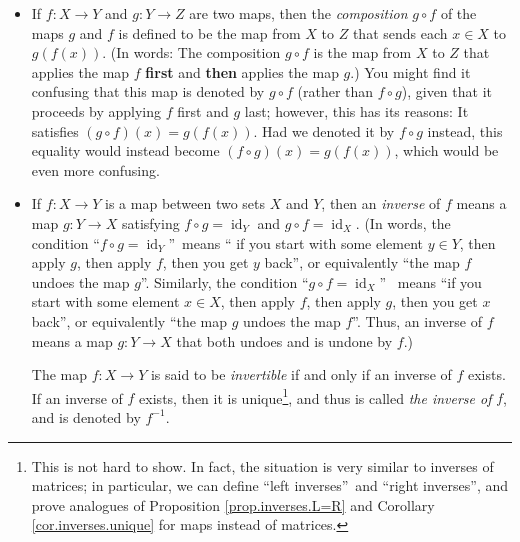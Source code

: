 \documentclass[numbers=enddot,12pt,final,onecolumn,notitlepage]{scrartcl}%
\theoremstyle{definition}
\begin{document}
\begin{itemize}
\item If $f:X\rightarrow Y$ and $g:Y\rightarrow Z$ are two maps, then the
\textit{composition} $g\circ f$ of the maps $g$ and $f$ is defined to be the
map from $X$ to $Z$ that sends each $x\in X$ to $g\left(  f\left(  x\right)
\right)  $. (In words: The composition $g\circ f$ is the map from $X$ to $Z$
that applies the map $f$ \textbf{first} and \textbf{then} applies the map
$g$.) You might find it confusing that this map is denoted by $g\circ f$
(rather than $f\circ g$), given that it proceeds by applying $f$ first and $g$
last; however, this has its reasons: It satisfies $\left(  g\circ f\right)
\left(  x\right)  =g\left(  f\left(  x\right)  \right)  $. Had we denoted it
by $f\circ g$ instead, this equality would instead become $\left(  f\circ
g\right)  \left(  x\right)  =g\left(  f\left(  x\right)  \right)  $, which
would be even more confusing.

\item If $f:X\rightarrow Y$ is a map between two sets $X$ and $Y$, then an
\textit{inverse} of $f$ means a map $g:Y\rightarrow X$ satisfying $f\circ
g=\operatorname*{id}\nolimits_{Y}$ and $g\circ f=\operatorname*{id}%
\nolimits_{X}$. (In words, the condition \textquotedblleft$f\circ
g=\operatorname*{id}\nolimits_{Y}$\textquotedblright\ means \textquotedblleft
if you start with some element $y\in Y$, then apply $g$, then apply $f$, then
you get $y$ back\textquotedblright, or equivalently \textquotedblleft the map
$f$ undoes the map $g$\textquotedblright. Similarly, the condition
\textquotedblleft$g\circ f=\operatorname*{id}\nolimits_{X}$\textquotedblright%
\ means \textquotedblleft if you start with some element $x\in X$, then apply
$f$, then apply $g$, then you get $x$ back\textquotedblright, or equivalently
\textquotedblleft the map $g$ undoes the map $f$\textquotedblright. Thus, an
inverse of $f$ means a map $g:Y\rightarrow X$ that both undoes and is undone
by $f$.)

The map $f:X\rightarrow Y$ is said to be \textit{invertible} if and only if an
inverse of $f$ exists. If an inverse of $f$ exists, then it is
unique\footnote{This is not hard to show. In fact, the situation is very
similar to inverses of matrices; in particular, we can define
\textquotedblleft left inverses\textquotedblright\ and \textquotedblleft right
inverses\textquotedblright, and prove analogues of Proposition
\ref{prop.inverses.L=R} and Corollary \ref{cor.inverses.unique} for maps
instead of matrices.}, and thus is called \textit{the inverse of }$f$, and is
denoted by $f^{-1}$.


\end{itemize}
\end{document}
